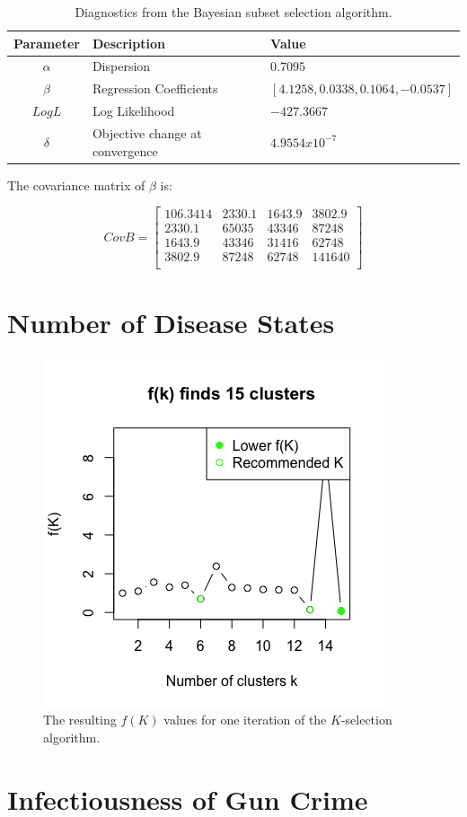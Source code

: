 \documentclass{article}
\begin{document}
\begin{table}[htbp] \centering
\label{SubsetParameters}
 \begin{tabular}{|c|l|l|} \hline
  \textbf{Parameter} & \textbf{Description} & \textbf{Value} \\\hline
  $\alpha$ & Dispersion & $0.7095$ \\\hline
  $\beta$ & Regression Coefficients & $[4.1258, 0.0338, 0.1064, -0.0537]$ \\\hline
  $LogL$ & Log Likelihood & $-427.3667$ \\\hline
  $\delta$ & Objective change at convergence & $4.9554 x 10^{-7}$ \\\hline
 \end{tabular}
 \caption{Diagnostics from the Bayesian subset selection algorithm.}
\end{table}

The covariance matrix of $\beta$ is:

\[ CovB = 
\begin{bmatrix}
 106.3414 & 2330.1 & 1643.9 & 3802.9 \\
 2330.1 & 65035 & 43346 & 87248 \\
 1643.9 & 43346 & 31416 & 62748 \\
 3802.9 & 87248 & 62748 & 141640 \\
\end{bmatrix}
\]

\pagebreak
\section*{Number of Disease States}
\begin{figure}[htbp] \centering
 \label{KClusters}
 \includegraphics[scale=1]{figures/Kselection_15.png}
 \caption{The resulting $f(K)$ values for one iteration of the $K$-selection algorithm.}
\end{figure}

\pagebreak
\section*{Infectiousness of Gun Crime}
\end{document}
